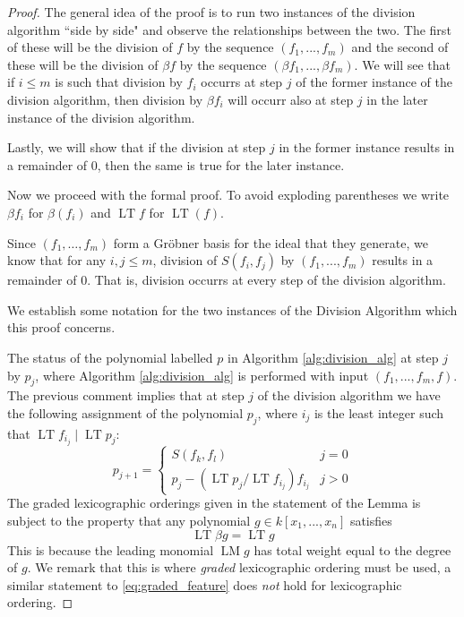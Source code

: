 \documentclass[12pt]{article}
\theoremstyle{plain}
\theoremstyle{definition}
\begin{document}
\begin{proof}
	The general idea of the proof is to run two instances of the division algorithm ``side by side" and observe the relationships between the two. The first of these will be the division of $f$ by the sequence $(f_1,...,f_m)$ and the second of these will be the division of $\beta f$ by the sequence $(\beta f_1, ..., \beta f_m)$. We will see that if $i \leq m$ is such that division by $f_i$ occurrs at step $j$ of the former instance of the division algorithm, then division by $\beta f_i$ will occurr also at step $j$ in the later instance of the division algorithm.
	
	Lastly, we will show that if the division at step $j$ in the former instance results in a remainder of $0$, then the same is true for the later instance.
	
	Now we proceed with the formal proof. To avoid exploding parentheses we write $\beta f_i$ for $\beta(f_i)$ and $\operatorname{LT}f$ for $\operatorname{LT}(f)$.
	
	Since $(f_1,\hdots,f_m)$ form a Gr\"{o}bner basis for the ideal that they generate, we know that for any $i,j \leq m$, division of $S(f_i,f_j)$ by $(f_1,...,f_m)$ results in a remainder of $0$. That is, division occurrs at every step of the division algorithm.
	
	We establish some notation for the two instances of the Division Algorithm which this proof concerns.
	
	The status of the polynomial labelled $p$ in Algorithm \ref{alg:division_alg} at step $j$ by $p_j$, where Algorithm \ref{alg:division_alg} is performed with input $(f_1,...,f_m,f)$. The previous comment implies that at step $j$ of the division algorithm we have the following assignment of the polynomial $p_j$, where $i_j$ is the least integer such that $\operatorname{LT}f_{i_j} \mid \operatorname{LT}p_j$:
	\begin{equation}
		p_{j + 1} = 
		\begin{cases}
			S(f_k, f_l) & j = 0\\
			p_j - (\operatorname{LT}p_j/\operatorname{LT}f_{i_j})f_{i_j}& j > 0
			\end{cases}
		\end{equation}
	The graded lexicographic orderings given in the statement of the Lemma is subject to the property that any polynomial $g \in k[x_1,...,x_n]$ satisfies
	\begin{equation}\label{eq:graded_feature}
		\operatorname{LT}\beta g = \operatorname{LT}g
		\end{equation}	
	This is because the leading monomial $\operatorname{LM}g$ has total weight equal to the degree of $g$. We remark that this is where \emph{graded} lexicographic ordering must be used, a similar statement to \eqref{eq:graded_feature} does \emph{not} hold for lexicographic ordering.
	

\end{proof}
\end{document}

